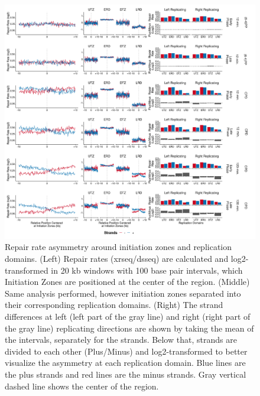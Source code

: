\begin{figure}[H]
    \begin{center}
    \includegraphics[width=\textwidth]{Chapters/4_results/figures/fig6}
    \caption[Repair rate asymmetry around initiation zones and replication domains.]{Repair rate asymmetry around initiation zones and replication domains. (Left) Repair rates (\gls{xrseq}/\gls{dsseq}) are calculated and log2-transformed in 20 \gls{kb} windows with 100 base pair intervals, which Initiation Zones are positioned at the center of the region. (Middle) Same analysis performed, however initiation zones separated into their corresponding replication domains. (Right) The strand differences at left (left part of the gray line) and right (right part of the gray line) replicating directions are shown by taking the mean of the intervals, separately for the strands. Below that, strands are divided to each other (Plus/Minus) and log2-transformed to better visualize the asymmetry at each replication domain. Blue lines are the plus strands and red lines are the minus strands. Gray vertical dashed line shows the center of the region.}
    \label{fig:repairrate}
    \end{center}
    \end{figure}

                                                                   

